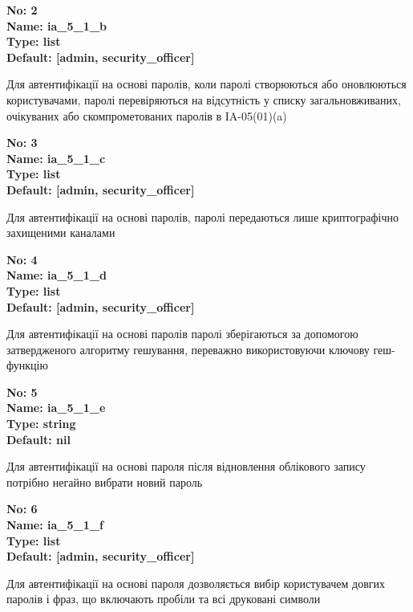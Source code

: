 \documentclass{article}
\begin{document}
{\footnotesize\bfseries
No: 2\\
Name: ia\_\allowbreak{}5\_\allowbreak{}1\_\allowbreak{}b\\
Type: list\\
Default: [\textquotedbl{}admin\textquotedbl{}, \textquotedbl{}security\_\allowbreak{}officer\textquotedbl{}]
}

{\footnotesize Для автентифікації на основі паролів, коли паролі створюються або оновлюються користувачами, паролі перевіряються на відсутність у списку загальновживаних, очікуваних або скомпрометованих паролів в IA-05(01)(a)}


{\footnotesize\bfseries
No: 3\\
Name: ia\_\allowbreak{}5\_\allowbreak{}1\_\allowbreak{}c\\
Type: list\\
Default: [\textquotedbl{}admin\textquotedbl{}, \textquotedbl{}security\_\allowbreak{}officer\textquotedbl{}]
}

{\footnotesize Для автентифікації на основі паролів, паролі передаються лише криптографічно захищеними каналами}


{\footnotesize\bfseries
No: 4\\
Name: ia\_\allowbreak{}5\_\allowbreak{}1\_\allowbreak{}d\\
Type: list\\
Default: [\textquotedbl{}admin\textquotedbl{}, \textquotedbl{}security\_\allowbreak{}officer\textquotedbl{}]
}

{\footnotesize Для автентифікації на основі паролів паролі зберігаються за допомогою затвердженого алгоритму гешування, переважно використовуючи ключову геш-функцію}


{\footnotesize\bfseries
No: 5\\
Name: ia\_\allowbreak{}5\_\allowbreak{}1\_\allowbreak{}e\\
Type: string\\
Default: nil
}

{\footnotesize Для автентифікації на основі пароля після відновлення облікового запису потрібно негайно вибрати новий пароль}


{\footnotesize\bfseries
No: 6\\
Name: ia\_\allowbreak{}5\_\allowbreak{}1\_\allowbreak{}f\\
Type: list\\
Default: [\textquotedbl{}admin\textquotedbl{}, \textquotedbl{}security\_\allowbreak{}officer\textquotedbl{}]
}

{\footnotesize Для автентифікації на основі пароля дозволяється вибір користувачем довгих паролів і фраз, що включають пробіли та всі друковані символи}
\end{document}
